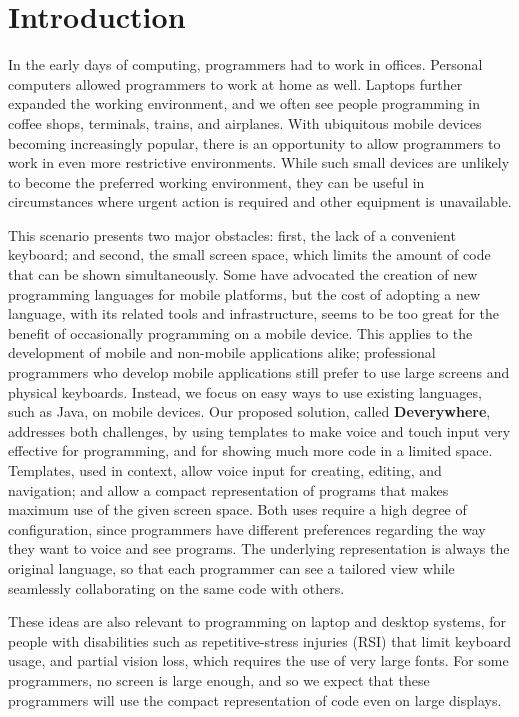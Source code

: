 \chapter{Introduction}
In the early days of computing, programmers had to work in offices. Personal computers allowed programmers to work at home as well. Laptops further expanded the working environment, and we often see people programming in coffee shops, terminals, trains, and airplanes. With ubiquitous mobile devices becoming increasingly popular, there is an opportunity to allow programmers to work in even more restrictive environments. While such small devices are unlikely to become the preferred working environment, they can be useful in circumstances where urgent action is required and other equipment is unavailable.

This scenario presents two major obstacles: first, the lack of a convenient keyboard; and second, the small screen space, which limits the amount of code that can be shown simultaneously. Some have advocated the creation of new programming languages for mobile platforms, but the cost of adopting a new language, with its related tools and infrastructure, seems to be too great for the benefit of occasionally programming on a mobile device. This applies to the development of mobile and non-mobile applications alike; professional programmers who develop mobile applications still prefer to use large screens and physical keyboards. Instead, we focus on easy ways to use existing languages, such as Java, on mobile devices. Our proposed solution, called \textbf{Deverywhere}, addresses both challenges, by using templates to make voice and touch input very effective for programming, and for showing much more code in a limited space. Templates, used in context, allow voice input for creating, editing, and navigation; and allow a compact representation of programs that makes maximum use of the given screen space. Both uses require a high degree of configuration, since programmers have different preferences regarding the way they want to voice and see programs. The underlying representation is always the original language, so that each programmer can see a tailored view while seamlessly collaborating on the same code with others.

These ideas are also relevant to programming on laptop and desktop systems, for people with disabilities such as repetitive-stress injuries (RSI) that limit keyboard usage, and partial vision loss, which requires the use of very large fonts. For some programmers, no screen is large enough, and so we expect that these programmers will use the compact representation of code even on large displays.
